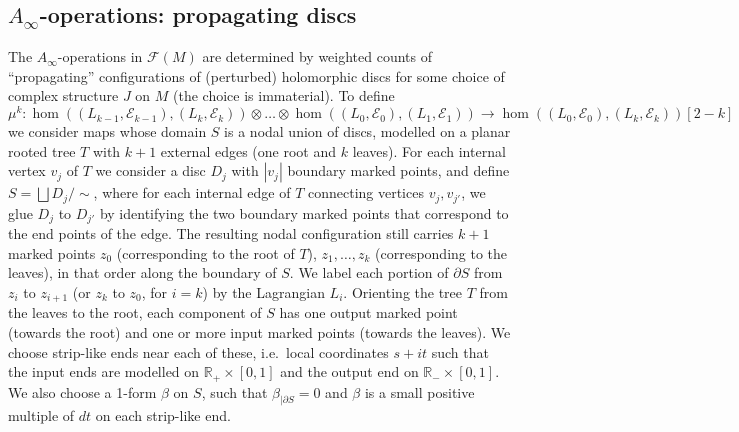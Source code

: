 \documentclass[11pt,leqno]{amsart}
\numberwithin{equation}{section}
\def\R{\mathbb{R}}
\def\F{{\mathcal F}}
\newcommand{\cE}{{\mathcal E}}
\begin{document}
\subsection{$A_\infty$-operations: propagating discs}

The $A_\infty$-operations in $\F(M)$ are determined by weighted counts of
``propagating'' configurations of (perturbed) holomorphic discs for some
choice of complex structure $J$ on $M$ (the choice is 
immaterial). To define $$\mu^k:\hom((L_{k-1},\cE_{k-1}),(L_k,\cE_k))\otimes
\dots\otimes \hom((L_0,\cE_0),(L_1,\cE_1))\to 
\hom((L_0,\cE_0),(L_k,\cE_k))[2-k]$$ we consider maps whose
domain $S$ is a nodal union of discs, modelled on a planar rooted 
tree $T$ with $k+1$ external edges (one root and $k$ leaves).
For each internal vertex $v_j$ of $T$ we consider a disc $D_j$ with $|v_j|$ boundary marked points,
and define $S=\bigsqcup D_j/\sim$, where for each internal edge of $T$
connecting vertices $v_j,v_{j'}$, we glue $D_j$ to $D_{j'}$ by identifying 
the two boundary marked points that correspond to the end points of the edge. 
The resulting nodal configuration still carries $k+1$ marked
points $z_0$ (corresponding to the root of $T$), $z_1,\dots,z_k$ (corresponding to the leaves), 
in that order along the boundary of $S$. We label each portion of
$\partial S$ from $z_i$ to $z_{i+1}$ (or $z_k$ to $z_0$, for $i=k$) by 
the Lagrangian $L_i$. 
Orienting the tree $T$ from the leaves to the root, 
each component of $S$
has one output marked point (towards the root) and one or more input marked
points (towards the leaves). We choose strip-like ends near each of these,
i.e.\ local coordinates $s+it$ such that the input ends are modelled on 
$\R_+\times [0,1]$ and the output end on $\R_-\times [0,1]$. 
We also choose a 1-form $\beta$ on $S$, such that $\beta_{|\partial S}=0$
and $\beta$ is a small positive multiple of $dt$ on each strip-like end.
\end{document}
